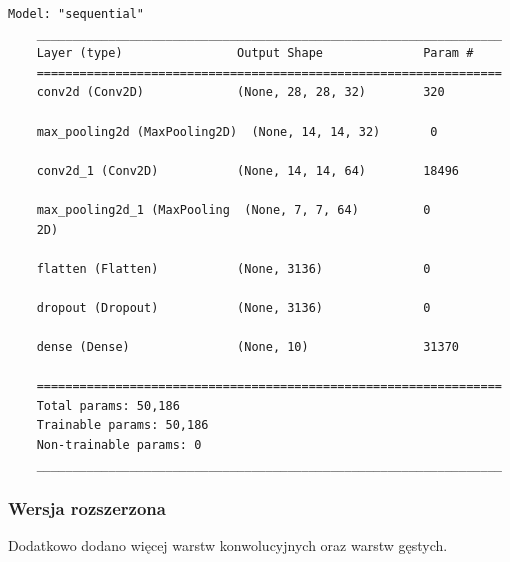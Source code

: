 \documentclass{article}
\begin{document}

\begin{lstlisting}[style=siec]
    Model: "sequential"
    _________________________________________________________________
    Layer (type)                Output Shape              Param #   
    =================================================================
    conv2d (Conv2D)             (None, 28, 28, 32)        320       
                                                                    
    max_pooling2d (MaxPooling2D)  (None, 14, 14, 32)       0                                                                      
                                                                    
    conv2d_1 (Conv2D)           (None, 14, 14, 64)        18496     
                                                                    
    max_pooling2d_1 (MaxPooling  (None, 7, 7, 64)         0         
    2D)                                                             
                                                                    
    flatten (Flatten)           (None, 3136)              0         
                                                                    
    dropout (Dropout)           (None, 3136)              0         
                                                                    
    dense (Dense)               (None, 10)                31370     
                                                                    
    =================================================================
    Total params: 50,186
    Trainable params: 50,186
    Non-trainable params: 0
    _________________________________________________________________
\end{lstlisting}

\subsubsection{Wersja rozszerzona}

Dodatkowo dodano więcej warstw konwolucyjnych oraz warstw gęstych.
\end{document}
